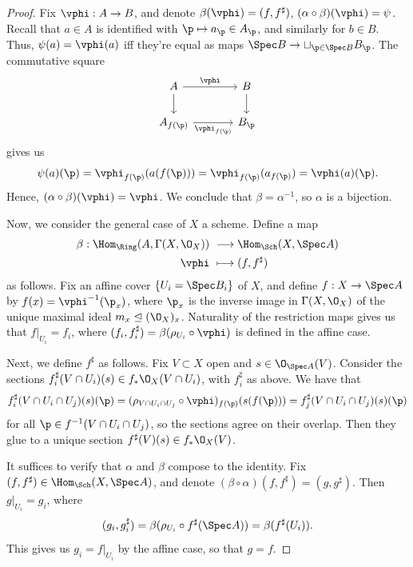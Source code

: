 \documentclass[12pt]{amsart}
\begin{document}
\begin{proof}
  Fix $\vphi:A\to B$, and denote $\beta(\vphi)=(f,f^\sharp)$, $(\alpha\circ \beta)(\vphi)= \psi$.
  Recall that $a\in A$ is identified with $\p\mapsto a_\p\in A_\p$, and similarly for $b\in B$.
  Thus, $\psi(a)=\vphi(a)$ iff they're equal as maps $\Spec B\to \sqcup_{\p\in \Spec B}B_\p$.
  The commutative square
  \[
    \begin{tikzcd}[column sep = large]
      A\ar[d]
      \ar[r,"\vphi"]&B\ar[d] \\
      A_{f(\p)}\ar[r,"\vphi_{f(\p)}"']&B_\p
    \end{tikzcd}
  \] 
  gives us
  \[
    \psi(a)(\p) = \vphi_{f(\p)}(a(f(\p))) = \vphi_{f(\p)}(a_{f(\p)}) = \vphi(a)(\p).
  \]
  Hence, $(\alpha\circ\beta)(\vphi)=\vphi$.
  We conclude that $\beta=\alpha^{-1}$, so $\alpha$ is a bijection.

  Now, we consider the general case of $X$ a scheme. 
  Define a map 
  \begin{align*}
    \beta:\Hom_{\Ring}(A,\Gamma(X,\O_X))&~\longrightarrow \Hom_{\Sch}(X,\Spec A) \\
    \vphi&~\longmapsto (f,f^\sharp)
  \end{align*}
  as follows.
  Fix an affine cover $\{U_i=\Spec B_i\}$ of $X$, and define $f:X\to \Spec A$ by $f(x)=\vphi^{-1}(\p_x)$, where $\p_x$ is the inverse image in $\Gamma(X,\O_X)$ of the unique maximal ideal $m_x\trianglelefteq(\O_X)_x$.
  Naturality of the restriction maps gives us that $f|_{U_i}=f_i$, where $(f_i,f_i^\sharp)=\beta(\rho_{U_i}\circ \vphi)$ is defined in the affine case.
  
  Next, we define $f^\sharp$ as follows.
  Fix $V\subset X$ open and $s\in \O_{\Spec A}(V)$.
  Consider the sections $f^\sharp_i(V\cap U_i)(s)\in f_*\O_X(V\cap U_i)$, with $f^\sharp_i$ as above.
  We have that 
  \begin{align*}
    f^\sharp_i(V\cap U_i\cap U_j)(s)(\p) 
    = (\rho_{V\cap U_i\cap U_j}\circ \vphi)_{f(\p)} (s(f(\p)))
    = f^\sharp_j(V\cap U_i\cap U_j)(s)(\p) 
  \end{align*}
  for all $\p\in f^{-1}(V\cap U_i\cap U_j)$, so the sections agree on their overlap.
  Then they glue to a unique section $f^\sharp(V)(s)\in f_*\O_X(V)$.
  
  It suffices to verify that $\alpha$ and $\beta$ compose to the identity.
  Fix $(f,f^\sharp)\in \Hom_{\Sch}(X,\Spec A)$, and denote $(\beta\circ \alpha)(f,f^\sharp)=(g,g^\sharp)$.
  Then $g|_{U_i} = g_i$, where 
  \[
    (g_i,g_i^\sharp)= \beta(\rho_{U_i}\circ f^\sharp(\Spec A)) = \beta(f^\sharp(U_i)).
  \]
  This gives us $g_i=f|_{U_i}$ by the affine case, so that $g=f$. 


\end{proof}
\end{document}
